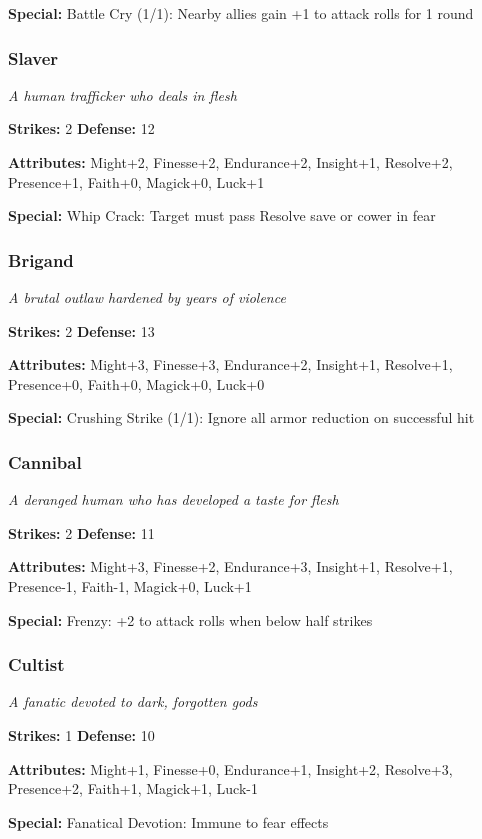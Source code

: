 \documentclass[10pt,twoside]{article}
\begin{document}
\textbf{Special:} Battle Cry (1/1): Nearby allies gain +1 to attack rolls for 1 round

\subsubsection{Slaver}
\textit{A human trafficker who deals in flesh}

\textbf{Strikes:} 2 \quad \textbf{Defense:} 12

\textbf{Attributes:} Might+2, Finesse+2, Endurance+2, Insight+1, Resolve+2, Presence+1, Faith+0, Magick+0, Luck+1

\textbf{Special:} Whip Crack: Target must pass Resolve save or cower in fear

\subsubsection{Brigand}
\textit{A brutal outlaw hardened by years of violence}

\textbf{Strikes:} 2 \quad \textbf{Defense:} 13

\textbf{Attributes:} Might+3, Finesse+3, Endurance+2, Insight+1, Resolve+1, Presence+0, Faith+0, Magick+0, Luck+0

\textbf{Special:} Crushing Strike (1/1): Ignore all armor reduction on successful hit

\subsubsection{Cannibal}
\textit{A deranged human who has developed a taste for flesh}

\textbf{Strikes:} 2 \quad \textbf{Defense:} 11

\textbf{Attributes:} Might+3, Finesse+2, Endurance+3, Insight+1, Resolve+1, Presence-1, Faith-1, Magick+0, Luck+1

\textbf{Special:} Frenzy: +2 to attack rolls when below half strikes

\subsubsection{Cultist}
\textit{A fanatic devoted to dark, forgotten gods}

\textbf{Strikes:} 1 \quad \textbf{Defense:} 10

\textbf{Attributes:} Might+1, Finesse+0, Endurance+1, Insight+2, Resolve+3, Presence+2, Faith+1, Magick+1, Luck-1

\textbf{Special:} Fanatical Devotion: Immune to fear effects
\end{document}
